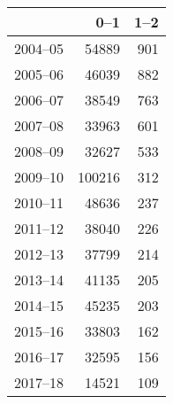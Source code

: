 \begin{table}[ht]
\centering
\begin{tabular}{rrr}
  \hline
 & 0--1 & 1--2 \\ 
  \hline
2004--05 & 54889 & 901 \\ 
  2005--06 & 46039 & 882 \\ 
  2006--07 & 38549 & 763 \\ 
  2007--08 & 33963 & 601 \\ 
  2008--09 & 32627 & 533 \\ 
  2009--10 & 100216 & 312 \\ 
  2010--11 & 48636 & 237 \\ 
  2011--12 & 38040 & 226 \\ 
  2012--13 & 37799 & 214 \\ 
  2013--14 & 41135 & 205 \\ 
  2014--15 & 45235 & 203 \\ 
  2015--16 & 33803 & 162 \\ 
  2016--17 & 32595 & 156 \\ 
  2017--18 & 14521 & 109 \\ 
   \hline
\end{tabular}
\end{table}
